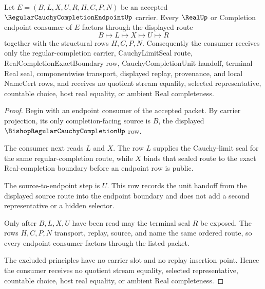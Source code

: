 \begin{theorem}
\label{thm:regular-cauchy-completion-endpoint-real-seal-handoff}
Let $E=(B,L,X,U,R,H,C,P,N)$ be an accepted $\RegularCauchyCompletionEndpointUp$ carrier. Every $\RealUp$ or Completion endpoint consumer of $E$ factors through the displayed route
$$
B \longmapsto L \longmapsto X \longmapsto U \longmapsto R
$$
together with the structural rows $H,C,P,N$. Consequently the consumer receives only the regular-completion carrier, CauchyLimitSeal route, RealCompletionExactBoundary row, CauchyCompletionUnit handoff, terminal Real seal, componentwise transport, displayed replay, provenance, and local NameCert rows, and receives no quotient stream equality, selected representative, countable choice, host real equality, or ambient Real completeness.
\end{theorem}
\begin{proof}
Begin with an endpoint consumer of the accepted packet. By carrier projection, its only completion-facing source is $B$, the displayed $\BishopRegularCauchyCompletionUp$ row.

The consumer next reads $L$ and $X$. The row $L$ supplies the Cauchy-limit seal for the same regular-completion route, while $X$ binds that sealed route to the exact Real-completion boundary before an endpoint row is public.

The source-to-endpoint step is $U$. This row records the unit handoff from the displayed source route into the endpoint boundary and does not add a second representative or a hidden selector.

Only after $B,L,X,U$ have been read may the terminal seal $R$ be exposed. The rows $H,C,P,N$ transport, replay, source, and name the same ordered route, so every endpoint consumer factors through the listed packet.

The excluded principles have no carrier slot and no replay insertion point. Hence the consumer receives no quotient stream equality, selected representative, countable choice, host real equality, or ambient Real completeness.
\end{proof}



